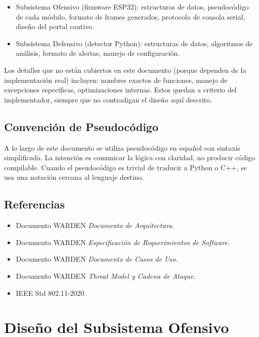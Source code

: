 \documentclass[11pt,a4paper]{article}
\begin{document}
\begin{itemize}
  \item Subsistema Ofensivo (firmware ESP32): estructuras de datos,
    pseudocódigo de cada módulo, formato de frames generados, protocolo
    de consola serial, diseño del portal cautivo.
  \item Subsistema Defensivo (detector Python): estructuras de datos,
    algoritmos de análisis, formato de alertas, manejo de configuración.
\end{itemize}

Los detalles que no están cubiertos en este documento (porque dependen
de la implementación real) incluyen: nombres exactos de funciones,
manejo de excepciones específicas, optimizaciones internas. Estos
quedan a criterio del implementador, siempre que no contradigan el
diseño aquí descrito.

\subsection{Convención de Pseudocódigo}
A lo largo de este documento se utiliza pseudocódigo en español con
sintaxis simplificada. La intención es comunicar la lógica con claridad,
no producir código compilable. Cuando el pseudocódigo es trivial de
traducir a Python o C++, se usa una notación cercana al lenguaje destino.

\subsection{Referencias}
\begin{itemize}
  \item Documento WARDEN \emph{Documento de Arquitectura}.
  \item Documento WARDEN \emph{Especificación de Requerimientos de Software}.
  \item Documento WARDEN \emph{Documento de Casos de Uso}.
  \item Documento WARDEN \emph{Threat Model y Cadena de Ataque}.
  \item IEEE Std 802.11-2020.
\end{itemize}

\section{Diseño del Subsistema Ofensivo}
\end{document}
